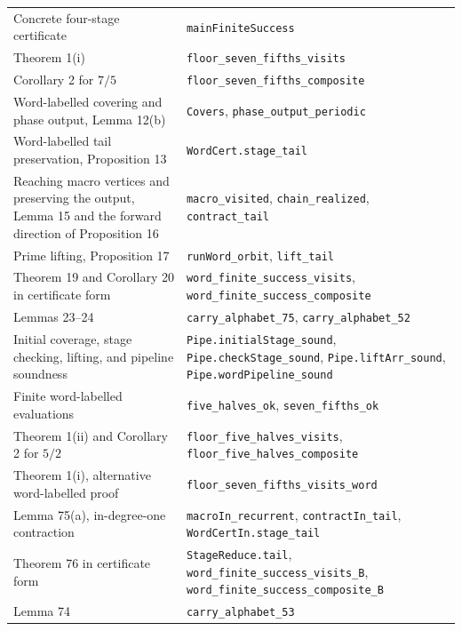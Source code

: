 \documentclass[11pt,reqno]{amsart}
\theoremstyle{definition}
\theoremstyle{remark}
\begin{document}
\begin{longtable}{@{}>{\raggedright\arraybackslash}p{} >{\raggedright\arraybackslash}p{}@{}}
Concrete four-stage certificate & \texttt{mainFiniteSuccess} \\
Theorem 1(i) & \nolinkurl{floor_seven_fifths_visits} \\
Corollary 2 for \(7/5\) & \nolinkurl{floor_seven_fifths_composite} \\
Word-labelled covering and phase output,\allowbreak{} Lemma 12(b) & \texttt{Covers},\allowbreak{} \nolinkurl{phase_output_periodic} \\
Word-labelled tail preservation,\allowbreak{} Proposition 13 & \nolinkurl{WordCert.stage_tail} \\
Reaching macro vertices and preserving the output,\allowbreak{} Lemma 15 and the forward direction of Proposition 16 & \nolinkurl{macro_visited},\allowbreak{} \nolinkurl{chain_realized},\allowbreak{} \nolinkurl{contract_tail} \\
Prime lifting,\allowbreak{} Proposition 17 & \nolinkurl{runWord_orbit},\allowbreak{} \nolinkurl{lift_tail} \\
Theorem 19 and Corollary 20 in certificate form & \nolinkurl{word_finite_success_visits},\allowbreak{} \nolinkurl{word_finite_success_composite} \\
Lemmas 23--24 & \nolinkurl{carry_alphabet_75},\allowbreak{} \nolinkurl{carry_alphabet_52} \\
Initial coverage,\allowbreak{} stage checking,\allowbreak{} lifting,\allowbreak{} and pipeline soundness & \nolinkurl{Pipe.initialStage_sound},\allowbreak{} \nolinkurl{Pipe.checkStage_sound},\allowbreak{} \nolinkurl{Pipe.liftArr_sound},\allowbreak{} \nolinkurl{Pipe.wordPipeline_sound} \\
Finite word-labelled evaluations & \nolinkurl{five_halves_ok},\allowbreak{} \nolinkurl{seven_fifths_ok} \\
Theorem 1(ii) and Corollary 2 for \(5/2\) & \nolinkurl{floor_five_halves_visits},\allowbreak{} \nolinkurl{floor_five_halves_composite} \\
Theorem 1(i),\allowbreak{} alternative word-labelled proof & \nolinkurl{floor_seven_fifths_visits_word} \\
Lemma 75(a),\allowbreak{} in-degree-one contraction & \nolinkurl{macroIn_recurrent},\allowbreak{} \nolinkurl{contractIn_tail},\allowbreak{} \nolinkurl{WordCertIn.stage_tail} \\
Theorem 76 in certificate form & \nolinkurl{StageReduce.tail},\allowbreak{} \nolinkurl{word_finite_success_visits_B},\allowbreak{} \nolinkurl{word_finite_success_composite_B} \\
Lemma 74 & \nolinkurl{carry_alphabet_53} \\

\end{longtable}
\end{document}
